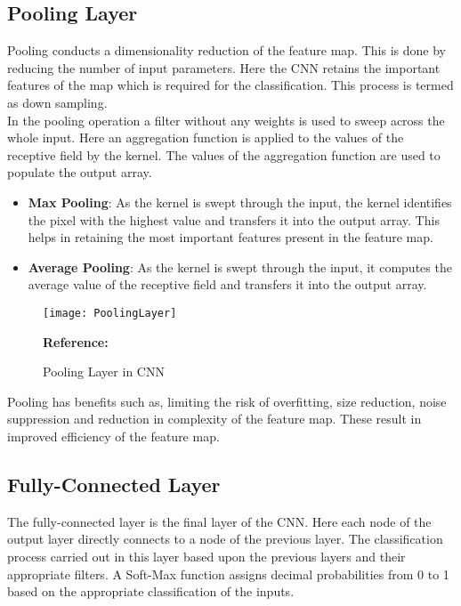 \subsection{Pooling Layer}

Pooling conducts a dimensionality reduction of the feature map. This is done by reducing the number of input parameters. Here the CNN retains the important features of the map which is required for the classification. This process is termed as down sampling.\\

In the pooling operation a filter without any weights is used to sweep across the whole input. Here an aggregation function is applied to the values of the receptive field by the kernel. The values of the aggregation function are used to populate the output array. \autocite{Education:2020}

\begin{itemize}
	\item \textbf{Max Pooling}:	As the kernel is swept through the input, the kernel identifies the pixel with the highest value and transfers it into the output array. This helps in retaining the most important features present in the feature map.
	\item \textbf{Average Pooling}:	As the kernel is swept through the input, it computes the average value of the receptive field and transfers it into the output array.
\end{itemize}

\begin{figure}  [H]
	\begin{center}
		\texttt{[image: PoolingLayer]}
		\caption{Pooling Layer in CNN} 
		\label{Pooling Layer in CNN}
		\footnotesize \textbf{Reference:} \autocite{KE:2022}
	\end{center}
\end{figure}

Pooling has benefits such as, limiting the risk of overfitting, size reduction, noise suppression and reduction in complexity of the feature map. These result in improved efficiency of the feature map.\\

\subsection{Fully-Connected Layer}
The fully-connected layer is the final layer of the CNN. Here each node of the output layer directly connects to a node of the previous layer. The classification process carried out in this layer based upon the previous layers and their appropriate filters. A Soft-Max function assigns decimal probabilities from 0 to 1 based on the appropriate classification of the inputs. \autocite{Education:2020}


